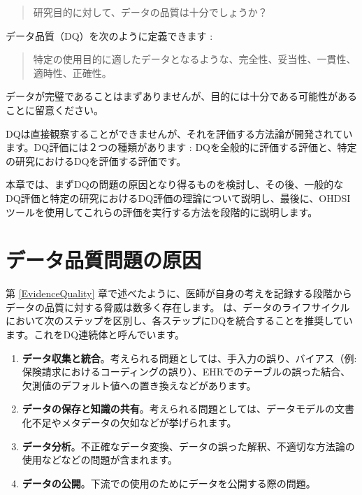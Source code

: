 \documentclass[
  11pt]{book}
\providecommand{\tightlist}{%
  \setlength{\itemsep}{0pt}\setlength{\parskip}{0pt}}
\theoremstyle{definition}
\theoremstyle{definition}
\theoremstyle{definition}
\theoremstyle{definition}
\theoremstyle{remark}
\begin{document}
\begin{quote}
研究目的に対して、データの品質は十分でしょうか？
\end{quote}

データ品質（DQ）を次のように定義できます \citep{roebuck_2012}: 

\begin{quote}
特定の使用目的に適したデータとなるような、完全性、妥当性、一貫性、適時性、正確性。
\end{quote}

データが完璧であることはまずありませんが、目的には十分である可能性があることに留意ください。

DQは直接観察することができませんが、それを評価する方法論が開発されています。DQ評価には２つの種類があります \citep{weiskopf_2013}: DQを全般的に評価する評価と、特定の研究におけるDQを評価する評価です。

本章では、まずDQの問題の原因となり得るものを検討し、その後、一般的なDQ評価と特定の研究におけるDQ評価の理論について説明し、最後に、OHDSIツールを使用してこれらの評価を実行する方法を段階的に説明します。

\section{データ品質問題の原因}\label{ux30c7ux30fcux30bfux54c1ux8ceaux554fux984cux306eux539fux56e0}

第 \ref{EvidenceQuality} 章で述べたように、医師が自身の考えを記録する段階からデータの品質に対する脅威は数多く存在します。\citet{dasu_2003} は、データのライフサイクルにおいて次のステップを区別し、各ステップにDQを統合することを推奨しています。これをDQ連続体と呼んでいます。

\begin{enumerate}
\def\labelenumi{\arabic{enumi}.}
\tightlist
\item
  \textbf{データ収集と統合}。考えられる問題としては、手入力の誤り、バイアス（例: 保険請求におけるコーディングの誤り）、EHRでのテーブルの誤った結合、欠測値のデフォルト値への置き換えなどがあります。
\item
  \textbf{データの保存と知識の共有}。考えられる問題としては、データモデルの文書化不足やメタデータの欠如などが挙げられます。
\item
  \textbf{データ分析}。不正確なデータ変換、データの誤った解釈、不適切な方法論の使用などなどの問題が含まれます。
\item
  \textbf{データの公開}。下流での使用のためにデータを公開する際の問題。
\end{enumerate}
\end{document}
